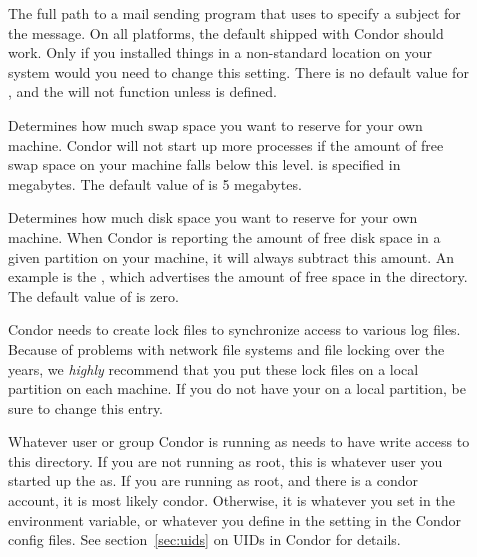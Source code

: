 \begin{description}
\item[] \label{param:Mail} The full path to a mail
  sending program that uses  to specify a subject for the
  message.  On all platforms, the default shipped with Condor should
  work.  Only if you installed things in a non-standard location on
  your system would you need to change this setting.  There is no
  default value for , and the  will not
  function unless  is defined.

\item[] \label{param:ReservedSwap} Determines
  how much swap space you want to reserve for your own machine.
  Condor will not start up more  processes if the
  amount of free swap space on your machine falls below this level.
   is specified in megabytes.  The default value
  of  is 5 megabytes.

\item[] \label{param:ReservedDisk} Determines
  how much disk space you want to reserve for your own machine.  When
  Condor is reporting the amount of free disk space in a given
  partition on your machine, it will always subtract this amount.  An
  example is the , which advertises the amount of free
  space in the  directory.  The default value of
   is zero.
  
\item[] \label{param:Lock} Condor needs to create
  lock files to synchronize access to various log files.  Because of
  problems with network file systems and file locking over
  the years, we \emph{highly} recommend that you put these lock
  files on a local partition on each machine.  If you do not have your
   on a local partition, be sure to change this
  entry.

  Whatever user or group Condor is running as needs to have
  write access to this directory.  If you are not running as root, this
  is whatever user you started up the  as.  If you are
  running as root, and there is a condor account, it is most
  likely condor.
  Otherwise, it is whatever you set in the 
  environment variable, or whatever you define in the
   setting in the Condor config files.
  See section~\ref{sec:uids} on UIDs in Condor for details.


\end{description}
